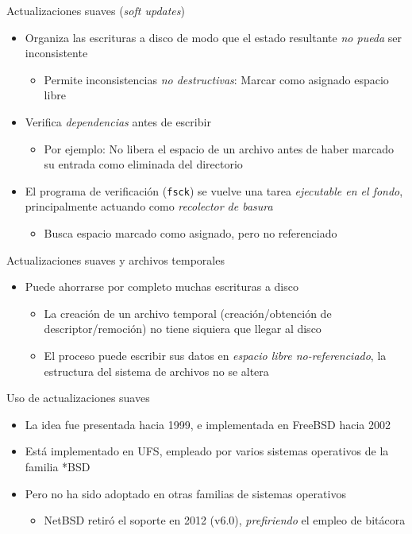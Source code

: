 \documentclass[presentation]{beamer}
\begin{document}
\begin{frame}[label={sec:orgf10e8c6},fragile]{Actualizaciones suaves (\emph{soft updates})}
 \begin{itemize}
\item Organiza las escrituras a disco de modo que el estado resultante \emph{no
pueda} ser inconsistente
\begin{itemize}
\item Permite inconsistencias \emph{no destructivas}: Marcar como asignado
espacio libre
\end{itemize}
\item Verifica \emph{dependencias} antes de escribir
\begin{itemize}
\item Por ejemplo: No libera el espacio de un archivo antes de haber
marcado su entrada como eliminada del directorio
\end{itemize}
\item El programa de verificación (\texttt{fsck}) se vuelve una tarea \emph{ejecutable
en el fondo}, principalmente actuando como \emph{recolector de basura}
\begin{itemize}
\item Busca espacio marcado como asignado, pero no referenciado
\end{itemize}
\end{itemize}
\end{frame}

\begin{frame}[label={sec:orge5c0a4d}]{Actualizaciones suaves y archivos temporales}
\begin{itemize}
\item Puede ahorrarse por completo muchas escrituras a disco
\begin{itemize}
\item La creación de un archivo temporal (creación/obtención de
descriptor/remoción) no tiene siquiera que llegar al disco
\item El proceso puede escribir sus datos en \emph{espacio libre
no-referenciado}, la estructura del sistema de archivos no se
altera
\end{itemize}
\end{itemize}
\end{frame}

\begin{frame}[label={sec:orgc8a556c}]{Uso de actualizaciones suaves}
\begin{itemize}
\item La idea fue presentada hacia 1999, e implementada en FreeBSD hacia
2002
\item Está implementado en UFS, empleado por varios sistemas operativos de
la familia *BSD
\item Pero no ha sido adoptado en otras familias de sistemas operativos
\begin{itemize}
\item NetBSD retiró el soporte en 2012 (v6.0), \emph{prefiriendo} el empleo
de bitácora
\end{itemize}
\end{itemize}
\end{frame}
\end{document}
